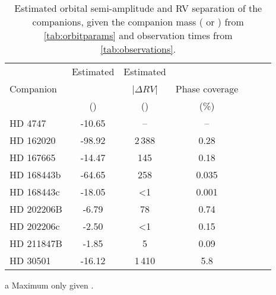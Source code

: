 \begin{table*}
    \small
    \centering
    \begin{threeparttable}[b]
        \caption[Semi-amplitude and RV separation of companions.]{Estimated orbital semi-amplitude and {RV} separation of the companions, given the companion mass (\Mtwo{} or \Mtwosini{}) from \cref{tab:orbitparams} and observation times from \cref{tab:observations}.}
        \begin{tabular}{l c c c c c c}%
            \toprule
             & Estimated & Estimated & & \\  %
             Companion & \Ktwo{} & |\(\Delta {RV}\)| & Phase coverage\\
             & (\kmps{}) & (\mps{}) & (\%)\\
             \midrule
             {HD 4747} & -10.65 & -- & --\\  %
             {HD 162020} & -98.92\tnote{a} & 2\,388 & 0.28\\  %
             {HD 167665} & -14.47\tnote{a} & 145 & 0.18\\  %
             {HD 168443b} & -64.65\tnote{a} & 258 & 0.035\\
             {HD 168443c} & -18.05\tnote{a} & <1 & 0.001\\  %
             {HD 202206}B & -6.79 & 78 & 0.74\\  %
             {HD 202206}c & -2.50 & <1 & 0.15\\  %
             {HD 211847}B & -1.85 & 5 & 0.09\\  %
             {HD 30501} & -16.12 & 1\,410 & 5.8\\
             \bottomrule
         \end{tabular}\label{tab:estimated_rv}
         \begin{tablenotes}
            \item[a] {Maximum \Ktwo{} only given \Mtwosini.}
         \end{tablenotes}
    \end{threeparttable}
\end{table*}
